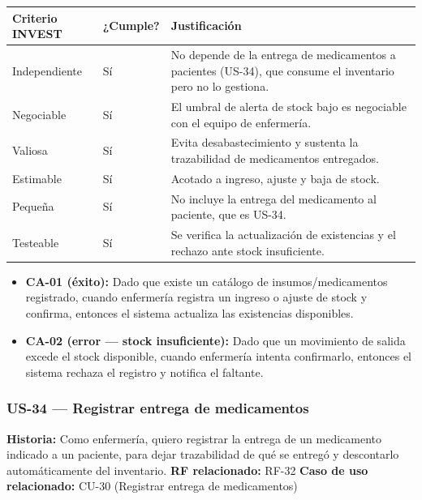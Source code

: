 \documentclass[11pt,a4paper]{article}
\providecommand{\tightlist}{%
	\setlength{\itemsep}{0pt}\setlength{\parskip}{0pt}}
\begin{document}
	\begin{longtable}{p{} p{} p{}}
		\toprule
		\textbf{Criterio INVEST} & \textbf{¿Cumple?} & \textbf{Justificación} \\
		\midrule
		\endhead
		Independiente & Sí & No depende de la entrega de medicamentos a pacientes (US-34), que consume el inventario pero no lo gestiona. \\
		Negociable & Sí & El umbral de alerta de stock bajo es negociable con el equipo de enfermería. \\
		Valiosa & Sí & Evita desabastecimiento y sustenta la trazabilidad de medicamentos entregados. \\
		Estimable & Sí & Acotado a ingreso, ajuste y baja de stock. \\
		Pequeña & Sí & No incluye la entrega del medicamento al paciente, que es US-34. \\
		Testeable & Sí & Se verifica la actualización de existencias y el rechazo ante stock insuficiente. \\
		\bottomrule
	\end{longtable}
	
	\begin{itemize}
		\tightlist
		\item \textbf{CA-01 (éxito):} Dado que existe un catálogo de insumos/medicamentos registrado, cuando enfermería registra un ingreso o ajuste de stock y confirma, entonces el sistema actualiza las existencias disponibles.
		\item \textbf{CA-02 (error --- stock insuficiente):} Dado que un movimiento de salida excede el stock disponible, cuando enfermería intenta confirmarlo, entonces el sistema rechaza el registro y notifica el faltante.
	\end{itemize}
	
	\subsubsection{US-34 --- Registrar entrega de medicamentos}
	
	\textbf{Historia:} Como enfermería, quiero registrar la entrega de un medicamento indicado a un paciente, para dejar trazabilidad de qué se entregó y descontarlo automáticamente del inventario.
	\textbf{RF relacionado:} RF-32
	\textbf{Caso de uso relacionado:} CU-30 (Registrar entrega de medicamentos)
	
\end{document}
